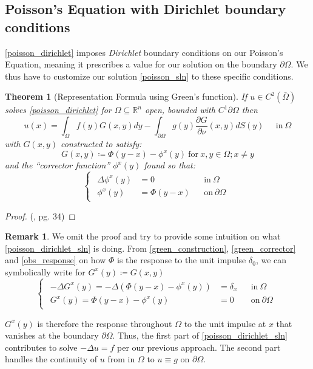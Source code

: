 \documentclass[openany, amssymb, psamsfonts]{amsart}
\newtheorem{thm}{Theorem}[section]
\theoremstyle{definition}
\newtheorem{rem}{Remark}[section]
\numberwithin{equation}{section}
\newcommand{\bbr}{\mathbb{R}}
\begin{document}
\subsection{Poisson's Equation with Dirichlet boundary conditions}
\eqref{poisson_dirichlet} imposes \textit{Dirichlet} boundary conditions on our Poisson's Equation, meaning it prescribes a value for our solution on the boundary $\partial \Omega$. We thus have to customize our solution \eqref{poisson_sln} to these specific conditions.
\begin{thm} [Representation Formula using Green's function]
If $u \in C^2(\bar{\Omega})$ solves \eqref{poisson_dirichlet} for $\Omega \subseteq \bbr^n$ open, bounded with $C^1 \partial \Omega$ then \begin{equation} \label{poisson_dirichlet_sln}
    u(x) = \int_{\Omega} f(y) G(x, y) dy - \int_{\partial \Omega} g(y) \dfrac{\partial G}{\partial \nu}(x, y) dS(y)  \;\;\;\;\; \text{in}\: \Omega
\end{equation}
with $G(x, y)$ constructed to satisfy:
\begin{equation} \label{green_construction}
    G(x, y) \coloneqq \Phi(y-x) - \phi^x(y) \:\text{for}\: x, y \in \Omega; x \neq y
\end{equation}
and the ``corrector function'' $\phi^x(y)$ found so that:
\begin{equation} \label{green_corrector}
    \begin{cases}
\begin{aligned}
    \Delta \phi^x (y) &= 0 &&\text{in}\: \Omega \\
    \phi^x (y) &= \Phi(y-x)  &&\text{on}\: \partial \Omega
\end{aligned}
\end{cases} 
\end{equation}
\end{thm}
\begin{proof}
(\cite{Evans}, pg. 34)
\end{proof}
\begin{rem}
We omit the proof and try to provide some intuition on what \eqref{poisson_dirichlet_sln} is doing. From \eqref{green_construction}, \eqref{green_corrector} and  \autoref{obs_response} on how $\Phi$ is the response to the unit impulse $\delta_0$, we can symbolically write for $G^x(y) \coloneqq G(x, y)$\begin{equation}
    \begin{cases}
        \begin{aligned}
        -\Delta G^x (y)= -\Delta (\Phi(y-x) - \phi^x(y)) &= \delta_x  &&\text{in}\: \Omega \\
        G^x (y)= \Phi(y-x) - \phi^x(y) &= 0  &&\text{on}\: \partial \Omega
        \end{aligned}
    \end{cases}
\end{equation}

$G^x(y)$ is therefore the response throughout $\Omega$ to the unit impulse at $x$ that vanishes at the boundary $\partial \Omega$. Thus, the first part of \eqref{poisson_dirichlet_sln} contributes to solve $-\Delta u = f$ per our previous approach. The second part handles the continuity of $u$ from in $\Omega$ to $u \equiv g$ on $\partial \Omega$.
\end{rem}
\end{document}
